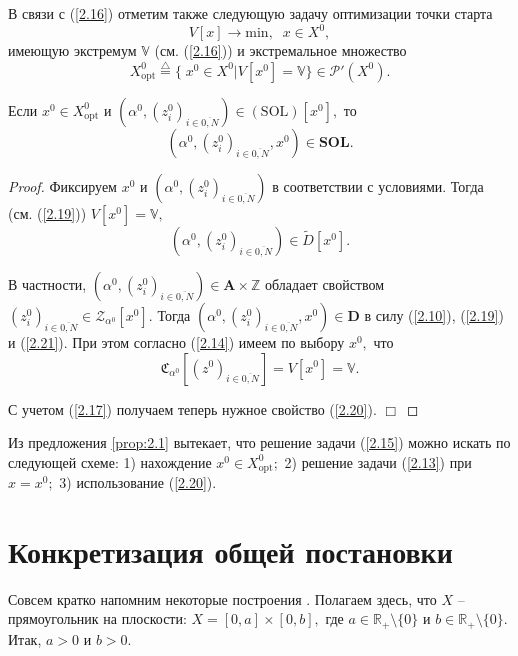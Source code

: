 \documentclass[10pt]{SPIIRAS_Proceedings}
\begin{document}
В связи с (\ref{2.16})
отметим также следующую задачу оптимизации точки старта
\begin{equation}\label{2.18}
  V[x] \longrightarrow \mathrm{min},\;\;x \in X^0,
\end{equation}
имеющую экстремум $\mathbb{V}$
(см. (\ref{2.16})) и экстремальное множество
\begin{equation}\label{2.19}
  X^0_{\mathrm{opt}} \stackrel{\triangle}{=} \{\;x^0 \in X^0 \vert V[x^0] = \mathbb{V}\} \in \mathcal{P}'(X^0).
\end{equation}

\begin{proposition}
\label{prop:2.1}
Если
$x^0 \in X^0_{\mathrm{opt}}$ и $(\alpha^0,(z_i^0)_{i \in \overline{0,N}}) \in (\mathrm{SOL})[x^0],$
то
\begin{equation}\label{2.20}
  (\alpha^0,(z_i^0)_{i \in \overline{0,N}},x^0) \in \mathbf{SOL}.
\end{equation}
\end{proposition}

\begin{proof}

Фиксируем $x^0$ и $(\alpha^0,(z_i^0)_{i \in \overline{0,N}})$
в соответствии с условиями.
Тогда (см. (\ref{2.19}))
$V[x^0] = \mathbb{V},$
\begin{equation}\label{2.21}
 (\alpha^0,(z_i^0)_{i \in \overline{0,N}}) \in \tilde{D}[x^0].
\end{equation}

В частности,
$(\alpha^0,(z_i^0)_{i \in \overline{0,N}}) \in \mathbf{A} \times \mathbb{Z}$
обладает свойством
$(z_i^0)_{i \in \overline{0,N}} \in \mathcal{Z}_{\alpha^0}[x^0].$
Тогда
$(\alpha^0,(z_i^0)_{i \in \overline{0,N}},x^0) \in \mathbf{D}$
в силу (\ref{2.10}), (\ref{2.19}) и (\ref{2.21}).
При этом согласно (\ref{2.14})
имеем по выбору $x^0,$ что
$$
  \mathfrak{C}_{\alpha^0}[(z^0)_{i \in \overline{0,N}}] = V[x^0] = \mathbb{V}.
$$

С учетом (\ref{2.17}) получаем теперь нужное свойство (\ref{2.20}).
\hfill $\Box$
\end{proof}

Из предложения \ref{prop:2.1} вытекает,
что решение задачи (\ref{2.15})
можно искать по следующей схеме:
1) нахождение $x^0 \in X^0_{\mathrm{opt}};$
2) решение задачи (\ref{2.13}) при $x = x^0;$
3) использование (\ref{2.20}).

\section{Конкретизация общей постановки}

Совсем кратко напомним некоторые построения \cite[$\S$ 3.3]{4}.
Полагаем здесь, что $X$ -- прямоугольник на плоскости:
$X = [0,a] \times [0,b],$
где $a \in \mathbb{R}_+ \setminus \{0\}$ и $b \in \mathbb{R}_+ \setminus \{0\}.$
Итак, $a > 0$ и $b > 0.$
\end{document}
